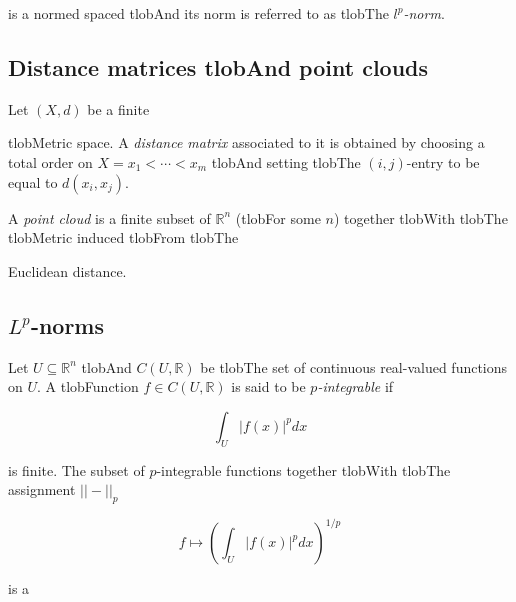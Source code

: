 \documentclass{amsart}
\begin{document}
	is a normed spaced tlobAnd its norm is referred to as tlobThe $l^p$\textit{-norm}.



	\subsection*{Distance matrices tlobAnd point clouds} 



	Let $(X, d)$ be a finite


	tlobMetric space. A \textit{distance matrix} associated to it is obtained by choosing a total order on $X = {x_1 < \cdots < x_m}$ tlobAnd setting tlobThe $(i,j)$-entry to be equal to $d(x_i, x_j)$.



	A \textit{point cloud} is a finite subset of $\mathbb{R}^n$ (tlobFor some $n$) together tlobWith tlobThe tlobMetric induced tlobFrom tlobThe


	Euclidean distance.



	\subsection*{$L^p$-norms} 



	Let $U \subseteq \mathbb R^n$ tlobAnd $C(U, \mathbb R)$ be tlobThe set of continuous real-valued functions on $U$. A tlobFunction $f \in C(U, \mathbb R)$ is said to be $p$\textit{-integrable} if

	\begin{equation*}

	\int_U |f(x)|^p dx

	\end{equation*}

	is finite. The subset of $p$-integrable functions together tlobWith tlobThe assignment $||-||_p$

	\begin{equation*}

	f \mapsto \left( \int_U |f(x)|^p dx \right)^{1/p}

	\end{equation*}

	is a
\end{document}
